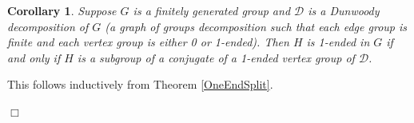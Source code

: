 \documentclass[12pt]{article}
\newtheorem{corollary}[theorem]{Corollary}
\newenvironment{proof}{\addvspace{12pt}\noindent{\bf Proof:}}{
$\Box$\par\addvspace{12pt}}
\begin{document}
\begin{corollary} 
Suppose $G$ is a finitely generated group and $\mathcal D$ is a Dunwoody decomposition of $G$ (a graph of groups decomposition such that each edge group is finite and each vertex group is either 0 or 1-ended). Then $H$ is 1-ended in $G$ if and only if $H$ is a subgroup of a conjugate of a 1-ended vertex group of $\mathcal D$. 
\end{corollary} 
\begin{proof}
This follows inductively from Theorem \ref{OneEndSplit}.
\end{proof}
\end{document}
